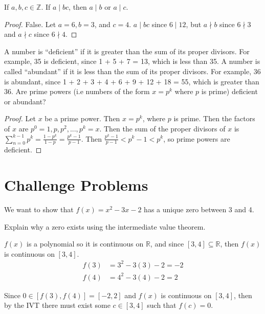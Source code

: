 \documentclass[12 pt]{exam}
\begin{document}
\begin{questions}
\question If $a,b, c \in \mathbb{Z}$. If $a \mid bc$, then $a \mid b$ or $a \mid c$. 

\begin{solution}\begin{proof}
    False. Let $a=6, b=3$, and $c=4$. $a \mid bc$ since $6 \mid 12$, but $a \nmid b$ since $6 \nmid 3$ and
    $a \nmid c$ since $6 \nmid 4$.
\end{proof}\end{solution}


\question A number is ``deficient” if it is greater than the sum of its proper divisors. For example, 35 is deficient, since 1 + 5 + 7 = 13, which is less than 35. A number is called “abundant” if it is less than the sum of its proper divisors. For example, 36 is abundant, since 1 + 2 + 3 + 4 + 6 + 9 + 12 + 18 = 55, which is greater than 36. Are prime powers (i.e numbers of the form $x=p^k$ where $p$ is prime) deficient or abundant?

\begin{solution}\begin{proof}
Let $x$ be a prime power. Then $x = p^k$, where $p$ is prime. Then the factors of $x$ are
$p^0=1, p, p^2, ..., p^k=x$. Then the sum of the proper divisors of $x$ is $\sum_{n=0}^{k-1} p^k = 
\frac{1-p^k}{1-p} = \frac{p^k - 1}{p-1}$. Then $\frac{p^k-1}{p-1} < p^k-1 < p^k$, so prime powers are
deficient.
\end{proof}\end{solution}


\section*{Challenge Problems}
\question We want to show that $f(x)=x^2-3x-2$ has a unique zero between 3 and 4. 
\begin{parts}
\item Explain why a zero exists using the intermediate value theorem. 

\begin{solution}
    $f(x)$ is a polynomial so it is continuous on $\mathbb{R}$, and since $[3, 4] \subseteq \mathbb{R}$,
    then $f(x)$ is continuous on $[3, 4]$.
    \begin{align*}
        f(3) &= 3^2 - 3(3) - 2 = -2 \\
        f(4) &= 4^2 - 3(4) - 2 = 2
    \end{align*}

    Since $0 \in [f(3), f(4)] = [-2, 2]$ and
    $f(x)$ is continuous on $[3, 4]$, then by the IVT there must exist some $c \in [3, 4]$ such that
    $f(c) = 0$.
\end{solution}



\end{parts}
\end{questions}
\end{document}
